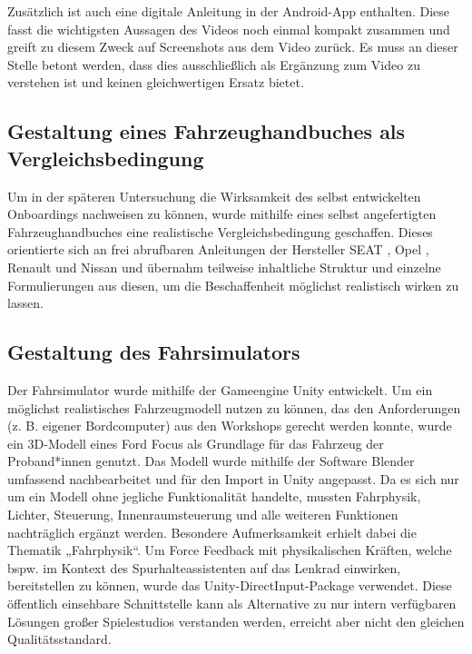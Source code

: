 Zusätzlich ist auch eine digitale Anleitung in der Android-App enthalten. Diese fasst die wichtigsten Aussagen des Videos noch einmal kompakt zusammen und greift zu diesem Zweck auf Screenshots aus dem Video zurück. Es muss an dieser Stelle betont werden, dass dies ausschließlich als Ergänzung zum Video zu verstehen ist und keinen gleichwertigen Ersatz bietet.

\subsection{Gestaltung eines Fahrzeughandbuches als Vergleichsbedingung}
\label{subsec:Gestaltung_Fahrzeughandbuch}
Um in der späteren Untersuchung die Wirksamkeit des selbst entwickelten Onboardings nachweisen zu können, wurde mithilfe eines selbst angefertigten Fahrzeughandbuches eine realistische Vergleichsbedingung geschaffen. Dieses orientierte sich an frei abrufbaren Anleitungen der Hersteller SEAT \cite{seat_leon_sportstourer_2020}, Opel \cite{opel_astra_2021}, Renault \cite{renault_scenic_2025} und Nissan \cite{nissan_juke_2024} und übernahm teilweise inhaltliche Struktur und einzelne Formulierungen aus diesen, um die Beschaffenheit möglichst realistisch wirken zu lassen. 

\subsection{Gestaltung des Fahrsimulators}
\label{subsec:Gestaltung_Fahrsimulator}

Der Fahrsimulator wurde mithilfe der Gameengine Unity \cite{unity_engine} entwickelt. Um ein möglichst realistisches Fahrzeugmodell nutzen zu können, das den Anforderungen (z. B. eigener Bordcomputer) aus den Workshops gerecht werden konnte, wurde ein 3D-Modell \cite{ddiaz_ford_focus_st_2025} eines Ford Focus als Grundlage für das Fahrzeug der Proband*innen genutzt. Das Modell wurde mithilfe der Software Blender \cite{blender_software} umfassend nachbearbeitet und für den Import in Unity angepasst. Da es sich nur um ein Modell ohne jegliche Funktionalität handelte, mussten Fahrphysik, Lichter, Steuerung, Innenraumsteuerung und alle weiteren Funktionen nachträglich ergänzt werden. Besondere Aufmerksamkeit erhielt dabei die Thematik „Fahrphysik“. Um Force Feedback mit physikalischen Kräften, welche bspw. im Kontext des Spurhalteassistenten auf das Lenkrad einwirken, bereitstellen zu können, wurde das Unity-DirectInput-Package \cite{imdanoush_unity_directinput} verwendet. Diese öffentlich einsehbare Schnittstelle kann als Alternative zu nur intern verfügbaren Lösungen großer Spielestudios verstanden werden, erreicht aber nicht den gleichen Qualitätsstandard.

